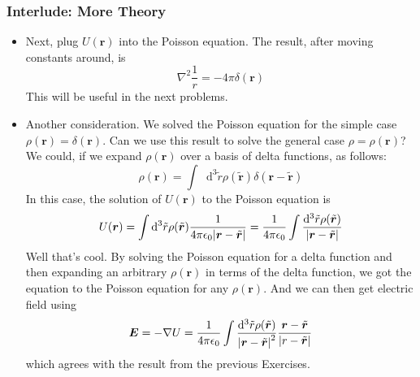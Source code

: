 \documentclass[11pt, a4paper]{article}
\newcommand{\diff}{\mathop{}\!\mathrm{d}} %
\renewcommand{\vec}[1]{\bm{#1}} %
\newcommand{\tvec}[1]{\tilde{\vec{#1}}} %
\renewcommand{\r}{\vec{r}}
\renewcommand{\grad}{\nabla}
\begin{document}
\subsubsection{Interlude: More Theory}
\begin{itemize}

	\item Next, plug $ U(\r) $ into the Poisson equation. The result, after moving constants around, is
	\begin{equation*}
		\nabla^{2}\frac{1}{r} = - 4\pi \delta(\r)
	\end{equation*}
	This will be useful in the next problems. 
	
	\item Another consideration. We solved the Poisson equation for the simple case $ \rho(\r) = \delta(\r) $. Can we use this result to solve the general case $ \rho = \rho(\r) $? We could, if we expand $ \rho(\r) $ over a basis of delta functions, as follows:
	\begin{equation*}
		\rho(\r) = \int \diff^{3}\tilde{r} \rho(\tvec{r}) \delta(\r - \tvec{r})
	\end{equation*}
	In this case, the solution of $ U(\r) $ to the Poisson equation is
	\begin{equation*}
		U(\r) = \int \diff^{3}\tilde{r}\rho(\tvec{r}) \frac{1}{4\pi \epsilon_{0}\abs{\r - \tvec{r}}} = \frac{1}{4\pi \epsilon_{0}} \int\frac{\diff^{3}\tilde{r}\rho(\tvec{r})}{\abs{\r - \tvec{r}}}
	\end{equation*}
	Well that's cool. By solving the Poisson equation for a delta function and then expanding an arbitrary $ \rho(\r) $ in terms of the delta function, we got the equation to the Poisson equation for any $ \rho(\r) $. And we can then get electric field using
	\begin{equation*}
		\vec{E} = - \grad U = \frac{1}{4\pi \epsilon_{0}} \int\frac{\diff^{3}\tilde{r}\rho(\tvec{r})}{\abs{\r - \tvec{r}}^{2}} \frac{\r - \tvec{r}}{\abs{r - \tvec{r}}}
	\end{equation*}
	which agrees with the result from the previous Exercises.
\end{itemize}
\end{document}
